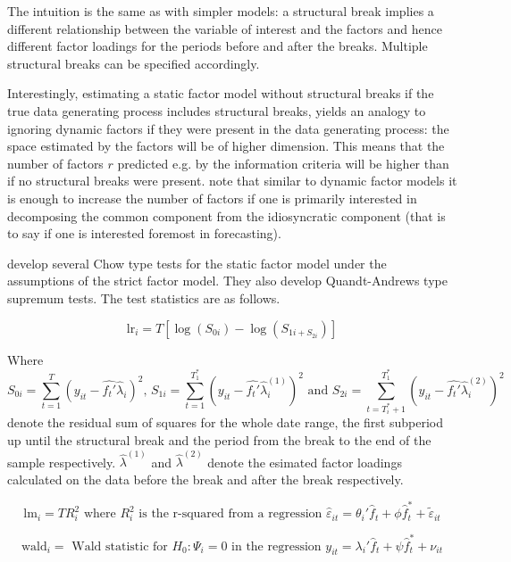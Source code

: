 \documentclass[11pt]{article}
\begin{document}
The intuition is the same as with simpler models: a structural break implies a different relationship between the variable of interest and the factors and hence different factor loadings for the periods before and after the breaks. Multiple structural breaks can be specified accordingly.

Interestingly, estimating a static factor model without structural breaks if the true data generating process includes structural breaks, yields an analogy to ignoring dynamic factors if they were present in the data generating process: the space estimated by the factors will be of higher dimension. This means that the number of factors $r$ predicted e.g. by the \citet{bai2002determining} information criteria will be higher than if no structural breaks were present. \citet{breitung2011testing} note that similar to dynamic factor models it is enough to increase the number of factors if one is primarily interested in decomposing the common component from the idiosyncratic component (that is to say if one is interested foremost in forecasting).


\citet{breitung2011testing} develop several Chow type tests for the static factor model under the assumptions of the strict factor model. They also develop Quandt-Andrews type supremum tests. The test statistics are as follows.


\begin{equation}
	\label{LR-Statistic}
	\text{lr}_i = T [ \log(S_{0i}) - \log(S_{1i + S_{2i}}) ]
\end{equation}

Where $$S_{0i} = \sum_{t=1}^{T}(y_{it} - \hat{f_t'} \hat \lambda_i)^2 \text{, } S_{1i} = \sum_{t=1}^{T_1^*}(y_{it} - \hat{f_t'} \hat \lambda_i^{(1)})^2 \text{ and } S_{2i} = \sum_{t=T^*_i+1}^{T_1^*}(y_{it} - \hat{f_t'} \hat \lambda_i^{(2)})^2 $$
denote the residual sum of squares for the whole date range, the first subperiod up until the structural break and the period from the break to the end of the sample respectively.
$\hat \lambda^{(1)}$ and $\hat \lambda^{(2)}$ denote the esimated factor loadings calculated on the data before the break and after the break respectively.

\begin{equation}
	\label{LM-Statistic}
	\text{lm}_i = T R^2_i \text{ where $R_i^2$ is the r-squared from a regression } \hat \varepsilon_{it} = \theta_i' \hat f_t + \phi \hat f_t^* + \tilde \varepsilon_{it}
\end{equation}

\begin{equation}
	\label{Wald-Statistic}
	\text{wald}_i = \text{ Wald statistic for $H_0: \Psi_i = 0$ in the regression } y_{it} = \lambda_i' \hat f_t + \psi \hat f_t^* + \nu_{it}
\end{equation}
\end{document}
